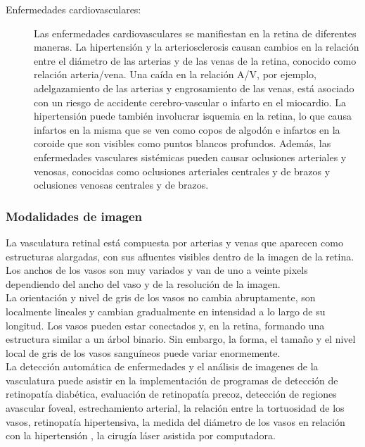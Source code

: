 \begin{description}
     
     \item[Enfermedades cardiovasculares:] Las enfermedades cardiovasculares se manifiestan en la retina de diferentes maneras. La hipertensión y la arteriosclerosis causan cambios en la relación entre el diámetro de las arterias y de las venas de la retina, conocido como relación arteria/vena. Una caída en la relación A/V, por ejemplo, adelgazamiento de las arterias y engrosamiento de las venas, está asociado con un riesgo de accidente cerebro-vascular o infarto en el miocardio. La hipertensión puede también involucrar isquemia en la retina, lo que causa infartos en la misma que se ven como copos de algodón e infartos en la coroide que son visibles como puntos blancos profundos. Además, las enfermedades vasculares sistémicas pueden causar oclusiones arteriales y venosas, conocidas como oclusiones arteriales centrales y de brazos y oclusiones venosas centrales y de brazos. \cite{fraz2012blood}
\end{description}






			\subsubsection{Modalidades de imagen}

La vasculatura retinal está compuesta por arterias y venas que aparecen como estructuras alargadas, con sus afluentes visibles dentro de la imagen de la retina.
Los anchos de los vasos son muy variados y van de uno a veinte pixels dependiendo del ancho del vaso y de la resolución de la imagen.
\\
La orientación y nivel de gris de los vasos no cambia abruptamente, son localmente lineales y cambian gradualmente en intensidad a lo largo de su longitud. Los vasos pueden estar conectados y, en la retina, formando una estructura similar a un árbol binario. Sin embargo, la forma, el tamaño y el nivel local de gris de los vasos sanguíneos puede variar enormemente.
\\
La detección automática de enfermedades y el análisis de imagenes de la vasculatura   puede asistir en la implementación de programas de detección de retinopatía diabética, evaluación de retinopatía precoz, detección de regiones avascular foveal, estrechamiento arterial, la relación entre la tortuosidad de los vasos, retinopatía hipertensiva, la medida del diámetro de los vasos en relación con la hipertensión , la cirugía láser asistida por computadora.\cite{fraz2012blood}\\



